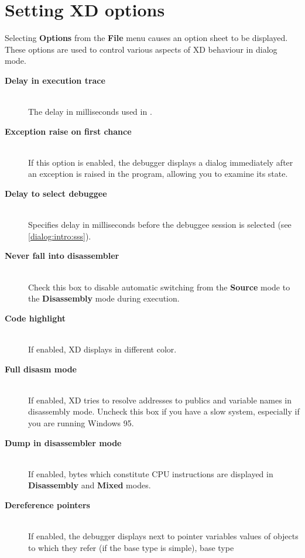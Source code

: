 \section{Setting XD options}
\label{dialog:options}

Selecting {\bf Options} from the {\bf File} menu causes an option sheet
to be displayed. These options are used to control various aspects of XD
behaviour in dialog mode.

\begin{description}
\item[{\bf Delay in execution trace}] \mbox{} \\
    The delay in milliseconds used in
    .
\item[{\bf Exception raise on first chance}] \mbox{} \\
    If this option is enabled, the debugger displays a
    dialog immediately after an exception is raised in the program,
    allowing you to examine its state.
\item[{\bf Delay to select debuggee}] \mbox{} \\
    Specifies delay in milliseconds before the debuggee session
    is selected (see \ref{dialog:intro:sss}).
\item[{\bf Never fall into disassembler}] \mbox{} \\
    Check this box to disable automatic switching
    from the {\bf Source} mode to the {\bf Disassembly} mode
    during execution.
\item[{\bf Code highlight}] \mbox{} \\
    If enabled, XD displays 
    in different color.
\item[{\bf Full disasm mode}] \mbox{} \\
    If enabled, XD tries to resolve addresses to publics and
    variable names in disassembly mode. Uncheck this box if you
    have a slow system, especially if you are running Windows 95.
\item[{\bf Dump in disassembler mode}] \mbox{} \\
    If enabled, bytes which constitute CPU instructions are displayed
    in {\bf Disassembly} and {\bf Mixed} modes.
\item[{\bf Dereference pointers}] \mbox{} \\
    If enabled, the debugger displays next to pointer variables values of
    objects to which they refer (if the base type is simple), base type

\end{description}
